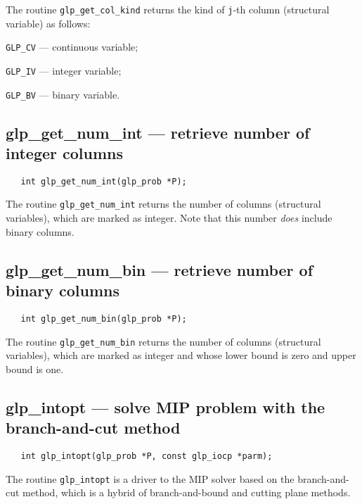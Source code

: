 The routine \verb|glp_get_col_kind| returns the kind of \verb|j|-th
column (structural variable) as follows:

\verb|GLP_CV| --- continuous variable;

\verb|GLP_IV| --- integer variable;

\verb|GLP_BV| --- binary variable.

\subsection{glp\_get\_num\_int --- retrieve number of integer columns}

\synopsis

\begin{verbatim}
   int glp_get_num_int(glp_prob *P);
\end{verbatim}

\returns

The routine \verb|glp_get_num_int| returns the number of columns
(structural variables), which are marked as integer. Note that this
number {\it does} include binary columns.

\newpage

\subsection{glp\_get\_num\_bin --- retrieve number of binary columns}

\synopsis

\begin{verbatim}
   int glp_get_num_bin(glp_prob *P);
\end{verbatim}

\returns

The routine \verb|glp_get_num_bin| returns the number of columns
(structural variables), which are marked as integer and whose lower
bound is zero and upper bound is one.

\subsection{glp\_intopt --- solve MIP problem with the branch-and-cut
method}

\synopsis

\begin{verbatim}
   int glp_intopt(glp_prob *P, const glp_iocp *parm);
\end{verbatim}

\description

The routine \verb|glp_intopt| is a driver to the MIP solver based on
the branch-and-cut method, which is a hybrid of branch-and-bound and
cutting plane methods.

